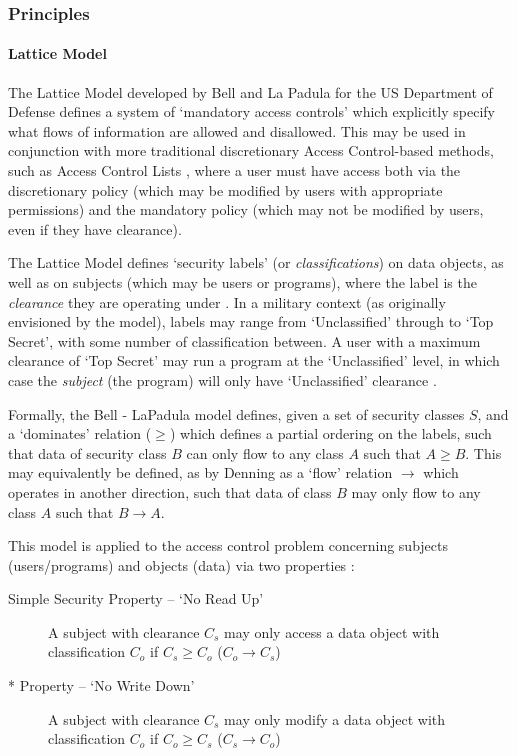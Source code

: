 \subsubsection{Principles}

	\paragraph{Lattice Model}
	
	The Lattice Model developed by Bell and La Padula for the US Department of Defense \cite{bell1976lattice} defines a system of `mandatory access controls' which explicitly specify what flows of information are allowed and disallowed. This may be used in conjunction with more traditional discretionary Access Control-based methods, such as Access Control Lists \cite{sandhu1993lattice}, where a user must have access both via the discretionary policy (which may be modified by users with appropriate permissions) and the mandatory policy (which may not be modified by users, even if they have clearance).
	
	The Lattice Model defines `security labels' (or \textit{classifications}) on data objects, as well as on subjects (which may be users or programs), where the label is the \textit{clearance} they are operating under \cite{denning1976lattice}. In a military context (as originally envisioned by the model), labels may range from `Unclassified' through to `Top Secret', with some number of classification between. A user with a maximum clearance of `Top Secret' may run a program at the `Unclassified' level, in which case the \textit{subject} (the program) will only have `Unclassified' clearance \cite{sandhu1993lattice}.
	
	Formally, the Bell - LaPadula model defines, given a set of security classes $ S $, and a `dominates' relation ($ \ge $) \cite{sandhu1993lattice} which defines a partial ordering on the labels, such that data of security class $ B $ can only flow to any class $ A $ such that $ A \ge B $. This may equivalently be defined, as by Denning \cite{denning1976lattice} as a `flow' relation $ \rightarrow $ which operates in another direction, such that data of class $ B $ may only flow to any class $ A $ such that $ B \rightarrow A $.
	
	This model is applied to the access control problem concerning subjects (users/programs) and objects (data) via two properties \cite{bell1973lattice}:
	
	\begin{description}
		\item[Simple Security Property -- `No Read Up'] A subject with clearance $ C_s $ may only access a data object with classification $ C_o $ if $ C_s \ge C_o $ ($ C_o \rightarrow C_s $)
		\item[* Property -- `No Write Down'] A subject with clearance $ C_s $ may only modify a data object with classification $ C_o $ if $ C_o \ge C_s $ ($ C_s \rightarrow C_o $)
	\end{description}
	
